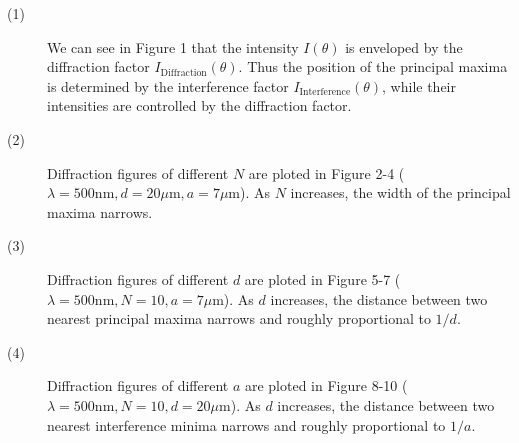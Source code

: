 \documentclass[11pt, twoside]{article}   	%
\theoremstyle{plain}
\theoremstyle{definition}
\begin{document}
	\begin{description}
		\item[(1)] We can see in Figure 1 that the intensity $I(\theta)$ is enveloped by the
			diffraction factor $I_{\text{Diffraction}}(\theta)$. Thus the position of the
			principal maxima is determined by the interference factor $I_{\text{Interference}}(
			\theta)$, while their intensities are controlled by the diffraction factor.
		\item[(2)] Diffraction figures of different $N$ are ploted in Figure 2-4 ($\lambda = 500
			\mathrm{nm}, d = 20\mu\mathrm{m}, a = 7\mu\mathrm{m}$). As $N$ increases, the width of
			the principal maxima narrows.
		\item[(3)] Diffraction figures of different $d$ are ploted in Figure 5-7 ($\lambda = 500
			\mathrm{nm}, N = 10, a = 7\mu\mathrm{m}$). As $d$ increases, the distance between two
			nearest principal maxima narrows and roughly proportional to $1/d$.
		\item[(4)] Diffraction figures of different $a$ are ploted in Figure 8-10 ($\lambda = 500
			\mathrm{nm}, N = 10, d = 20\mu\mathrm{m}$). As $d$ increases, the distance between two
			nearest interference minima narrows and roughly proportional to $1/a$.


\end{description}
\end{document}

